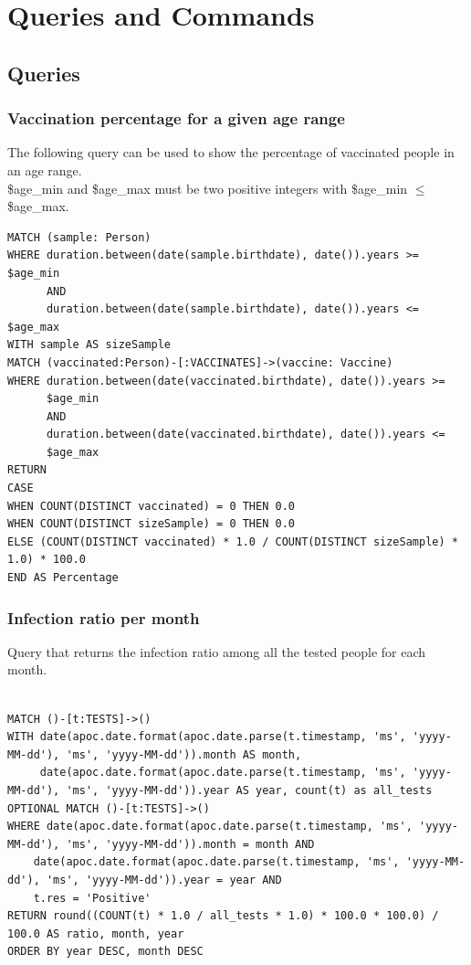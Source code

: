 \documentclass{article}
\begin{document}
\section{Queries and Commands}
\subsection{Queries}
\subsubsection{Vaccination percentage for a given age range}
The following query can be used to show the percentage of vaccinated people in an age range.\\
\$age\_min and \$age\_max must be two positive integers with \$age\_min $\le$ \$age\_max.\\

\begin{lstlisting}[language=cypher, label=lst:cypher-example]
MATCH (sample: Person)
WHERE duration.between(date(sample.birthdate), date()).years >= $age_min
      AND
      duration.between(date(sample.birthdate), date()).years <= $age_max
WITH sample AS sizeSample
MATCH (vaccinated:Person)-[:VACCINATES]->(vaccine: Vaccine)
WHERE duration.between(date(vaccinated.birthdate), date()).years >=
      $age_min
      AND
      duration.between(date(vaccinated.birthdate), date()).years <=
      $age_max
RETURN
CASE
WHEN COUNT(DISTINCT vaccinated) = 0 THEN 0.0
WHEN COUNT(DISTINCT sizeSample) = 0 THEN 0.0
ELSE (COUNT(DISTINCT vaccinated) * 1.0 / COUNT(DISTINCT sizeSample) * 1.0) * 100.0
END AS Percentage

\end{lstlisting}
\subsubsection{Infection ratio per month}
Query that returns the infection ratio among all the tested people for each month.
\begin{lstlisting}[language=cypher, label=lst:cypher-example]

MATCH ()-[t:TESTS]->()
WITH date(apoc.date.format(apoc.date.parse(t.timestamp, 'ms', 'yyyy-MM-dd'), 'ms', 'yyyy-MM-dd')).month AS month,
     date(apoc.date.format(apoc.date.parse(t.timestamp, 'ms', 'yyyy-MM-dd'), 'ms', 'yyyy-MM-dd')).year AS year, count(t) as all_tests
OPTIONAL MATCH ()-[t:TESTS]->()
WHERE date(apoc.date.format(apoc.date.parse(t.timestamp, 'ms', 'yyyy-MM-dd'), 'ms', 'yyyy-MM-dd')).month = month AND
    date(apoc.date.format(apoc.date.parse(t.timestamp, 'ms', 'yyyy-MM-dd'), 'ms', 'yyyy-MM-dd')).year = year AND
    t.res = 'Positive'
RETURN round((COUNT(t) * 1.0 / all_tests * 1.0) * 100.0 * 100.0) / 100.0 AS ratio, month, year
ORDER BY year DESC, month DESC
\end{lstlisting}
\end{document}
